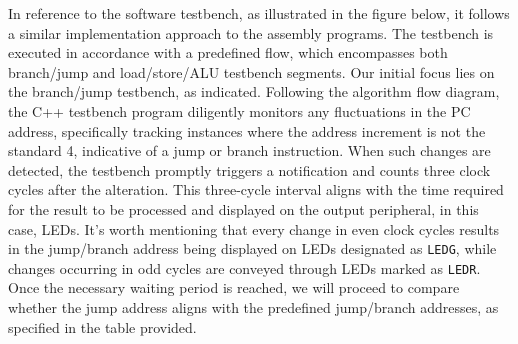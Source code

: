 \documentclass[12pt,a4paper,oneside]{book} %
\begin{document}
In reference to the software testbench, as illustrated in the figure below, it follows a similar implementation approach to the assembly programs. The testbench is executed in accordance with a predefined flow, which encompasses both branch/jump and load/store/ALU testbench segments. Our initial focus lies on the branch/jump testbench, as indicated. Following the algorithm flow diagram, the C++ testbench program diligently monitors any fluctuations in the PC address, specifically tracking instances where the address increment is not the standard 4, indicative of a jump or branch instruction. When such changes are detected, the testbench promptly triggers a notification and counts three clock cycles after the alteration. This three-cycle interval aligns with the time required for the result to be processed and displayed on the output peripheral, in this case, LEDs. It's worth mentioning that every change in even clock cycles results in the jump/branch address being displayed on LEDs designated as \texttt{LEDG}, while changes occurring in odd cycles are conveyed through LEDs marked as \texttt{LEDR}. Once the necessary waiting period is reached, we will proceed to compare whether the jump address aligns with the predefined jump/branch addresses, as specified in the table provided.
\end{document}
